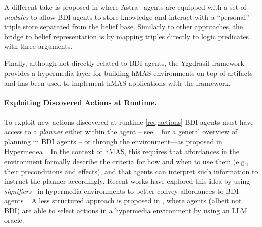 \documentclass[
]{ceurart}
\begin{document}
A different take is proposed in \cite{DBLP:conf/semweb/ONeillBBC21}
where Astra~\cite{CollierRL15} agents are equipped with a set of \emph{modules} to allow \ac{BDI} agents to store knowledge and interact with a ``personal'' triple store separated from the belief base.
Similarly to other approaches,
the bridge to belief representation is by mapping triples directly to logic predicates with three arguments.

Finally, although not directly related to \ac{BDI} agents, the Yggdrasil framework~\cite{ciortea2018emas} provides a hypermedia layer for building \ac{hMAS} environments on top of \cartago{} artifacts
and has been used to implement \ac{hMAS} applications with the \jacamo{} framework.


\paragraph{Exploiting Discovered Actions at Runtime.}

To exploit new actions discovered at runtime \ref{req:actions} \ac{BDI} agents must have access to a \emph{planner} either within the agent -- see ~\cite{MeneguzziS15} for a general overview of planning in \ac{BDI} agents -- or through the environment---as proposed in Hypermedea~\cite{DBLP:conf/www/CharpenayZLB22}.
%
In the context of \ac{hMAS}, 
this requires that affordances in the environment 
formally describe the criteria for how and when to use them 
(e.g., their preconditions and effects),
and that agents can interpret such information to instruct the planner accordingly.
%
Recent works have explored this idea by using \emph{signifiers}~\cite{vachtsevanou2023atal} in hypermedia environments to better convey affordances to \ac{BDI} agents~\cite{vachtsevanou2024atal}.
%
A less structured approach is proposed in \cite{10.1145/3603163.3609077,schmid2024kgswc},
where agents (albeit not \ac{BDI}) are able to select actions in a hypermedia environment by using an \ac{LLM} oracle.
\end{document}
